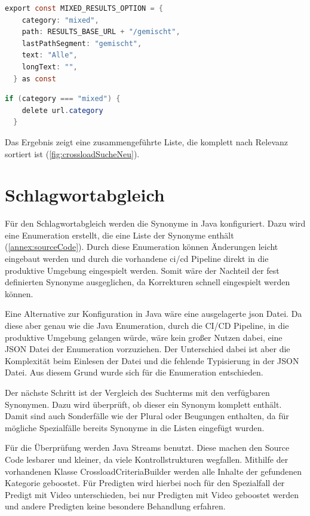 \begin{lstlisting}[language=Java, title={Erstellen der gemischten Kategorie \cite{frontend2022}}]
  export const MIXED_RESULTS_OPTION = {
    category: "mixed",
    path: RESULTS_BASE_URL + "/gemischt",
    lastPathSegment: "gemischt",
    text: "Alle",
    longText: "",
  } as const
\end{lstlisting}

\begin{lstlisting}[language=Java, title={Löschen der Kategorie aus den API Parametern \cite{frontend2022}}]
  if (category === "mixed") {
    delete url.category
  }
\end{lstlisting}

Das Ergebnis zeigt eine zusammengeführte Liste, die komplett nach Relevanz sortiert ist (\ref{fig:crossloadSucheNeu}).

\section{Schlagwortabgleich}
\label{sec:devKeywords}

Für den Schlagwortabgleich werden die Synonyme in Java konfiguriert.
Dazu wird eine Enumeration erstellt, die eine Liste der Synonyme enthält (\ref{annex:sourceCode}).
Durch diese Enumeration können Änderungen leicht eingebaut werden und durch die vorhandene \gls{ci}/\gls{cd} Pipeline direkt in die produktive Umgebung eingespielt werden.
Somit wäre der Nachteil der fest definierten Synonyme ausgeglichen, da Korrekturen schnell eingespielt werden können.

Eine Alternative zur Konfiguration in Java wäre eine ausgelagerte \gls{json} Datei.
Da diese aber genau wie die Java Enumeration, durch die CI/CD Pipeline, in die produktive Umgebung gelangen würde, wäre kein großer Nutzen dabei, eine JSON Datei der Enumeration vorzuziehen.
Der Unterschied dabei ist aber die Komplexität beim Einlesen der Datei und die fehlende Typisierung in der JSON Datei.
Aus diesem Grund wurde sich für die Enumeration entschieden.

Der nächste Schritt ist der Vergleich des Suchterms mit den verfügbaren Synonymen.
Dazu wird überprüft, ob dieser ein Synonym komplett enthält.
Damit sind auch Sonderfälle wie der Plural oder Beugungen enthalten, da für mögliche Spezialfälle bereits Synonyme in die Listen eingefügt wurden.

Für die Überprüfung werden Java Streams benutzt.
Diese machen den Source Code lesbarer und kleiner, da viele Kontrollstrukturen wegfallen.
Mithilfe der vorhandenen Klasse CrossloadCriteriaBuilder werden alle Inhalte der gefundenen Kategorie geboostet.
Für Predigten wird hierbei noch für den Spezialfall der Predigt mit Video unterschieden, bei nur Predigten mit Video geboostet werden und andere Predigten keine besondere Behandlung erfahren.

